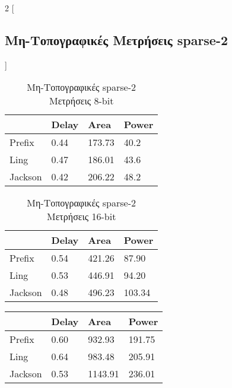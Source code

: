 \begin{multicols}{2}
[\subsection{Μη-Τοπογραφικές Μετρήσεις sparse-2}]

\begin{table}[H]
\centering
     \begin{tabular}{||p{1.2cm} | p{0.7cm} p{1cm} p{1cm}||} 
        \hline
        & Delay & Area & Power \\ [0.5ex] 
        \hline\hline
        Prefix  & 0.44  & 173.73    & 40.2 \\ 
        \hline
        Ling    & 0.47  & 186.01    & 43.6 \\
        \hline
        Jackson & 0.42  & 206.22    & 48.2 \\
        \hline
    \end{tabular}
\caption{Μη-Τοπογραφικές sparse-2 Μετρήσεις 8-bit}
\label{notopo_sparse2_result_table_8}
\end{table}
\begin{table}[H]
\centering
     \begin{tabular}{||p{1.2cm} | p{0.7cm} p{1cm} p{1cm}||} 
        \hline
        & Delay & Area & Power \\ [0.5ex] 
        \hline\hline
        Prefix  & 0.54  & 421.26    & 87.90 \\ 
        \hline
        Ling    & 0.53  & 446.91    & 94.20 \\
        \hline
        Jackson & 0.48  & 496.23    & 103.34 \\
        \hline
    \end{tabular}
\caption{Μη-Τοπογραφικές sparse-2 Μετρήσεις 16-bit}
\label{topo_sparse2_result_table_16}
\end{table}
\begin{table}[H]
\centering
     \begin{tabular}{||p{1.2cm} | p{0.7cm} p{1cm} p{1cm}||} 
        \hline
         & Delay & Area & Power \\ [0.5ex] 
        \hline\hline
        Prefix  & 0.60  & 932.93    & 191.75 \\ 
        \hline
        Ling    & 0.64  & 983.48    &  205.91 \\
        \hline
        Jackson & 0.53  & 1143.91    & 236.01 \\

\end{tabular}
\end{table}
\end{multicols}
